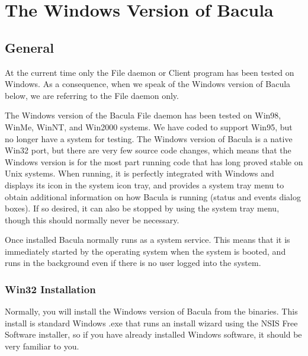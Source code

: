 
\section*{The Windows Version of Bacula}
\label{_ChapterStart7}

\subsection*{General}

At the current time only the File daemon or Client program has been tested on
Windows. As a consequence, when we speak of the Windows version of Bacula
below, we are referring to the File daemon only. 

The Windows version of the Bacula File daemon has been tested on Win98, WinMe,
WinNT, and Win2000 systems. We have coded to support Win95, but no longer have
a system for testing. The Windows version of Bacula is a native Win32 port,
but there are very few source code changes, which means that the Windows
version is for the most part running code that has long proved stable on Unix
systems. When running, it is perfectly integrated with Windows and displays
its icon in the system icon tray, and provides a system tray menu to obtain
additional information on how Bacula is running (status and events dialog
boxes). If so desired, it can also be stopped by using the system tray menu,
though this should normally never be necessary. 

Once installed Bacula normally runs as a system service. This means that it is
immediately started by the operating system when the system is booted, and
runs in the background even if there is no user logged into the system. 

\subsubsection*{Win32 Installation}
\label{installation}

Normally, you will install the Windows version of Bacula from the binaries.
This install is standard Windows .exe that runs an install wizard using the
NSIS Free Software installer, so if you have already installed Windows
software, it should be very familiar to you. 

